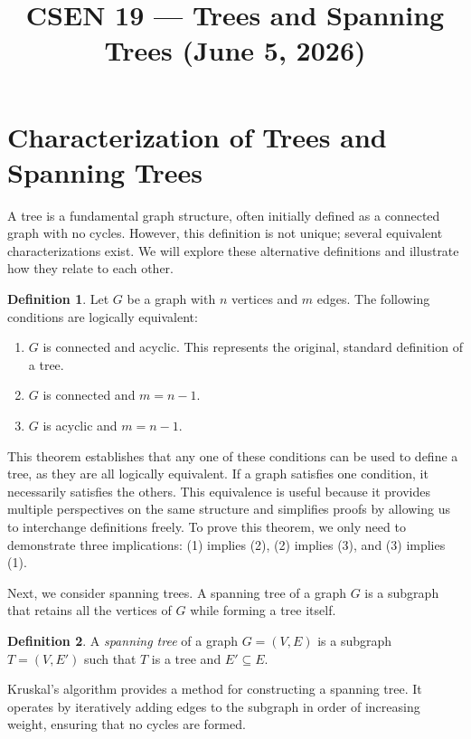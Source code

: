 \documentclass[11pt]{article}
\title{CSEN 19 — Trees and Spanning Trees (June 5, 2026)}
\date{}
\author{}
\theoremstyle{definition}
\newtheorem*{definition*}{Definition}
\begin{document}
\maketitle

\section*{Characterization of Trees and Spanning Trees}

A tree is a fundamental graph structure, often initially defined as a connected graph with no cycles. However, this definition is not unique; several equivalent characterizations exist. We will explore these alternative definitions and illustrate how they relate to each other.

\begin{definition*}
Let $G$ be a graph with $n$ vertices and $m$ edges. The following conditions are logically equivalent:
\begin{enumerate}
    \item $G$ is connected and acyclic. This represents the original, standard definition of a tree.
    \item $G$ is connected and $m = n - 1$.
    \item $G$ is acyclic and $m = n - 1$.
\end{enumerate}
\end{definition*}

This theorem establishes that any one of these conditions can be used to define a tree, as they are all logically equivalent.  If a graph satisfies one condition, it necessarily satisfies the others. This equivalence is useful because it provides multiple perspectives on the same structure and simplifies proofs by allowing us to interchange definitions freely. To prove this theorem, we only need to demonstrate three implications: (1) implies (2), (2) implies (3), and (3) implies (1).

Next, we consider spanning trees. A spanning tree of a graph $G$ is a subgraph that retains all the vertices of $G$ while forming a tree itself.

\begin{definition*}
A \emph{spanning tree} of a graph $G = (V, E)$ is a subgraph $T = (V, E')$ such that $T$ is a tree and $E' \subseteq E$.
\end{definition*}

Kruskal’s algorithm provides a method for constructing a spanning tree. It operates by iteratively adding edges to the subgraph in order of increasing weight, ensuring that no cycles are formed.
\end{document}
